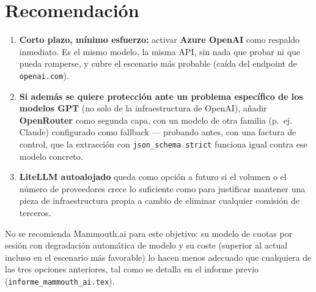 \documentclass[11pt,a4paper]{article}
\begin{document}
\section{Recomendación}

\begin{enumerate}
    \item \textbf{Corto plazo, mínimo esfuerzo:} activar \textbf{Azure OpenAI}
    como respaldo inmediato. Es el mismo modelo, la misma API, sin nada que
    probar ni que pueda romperse, y cubre el escenario más probable (caída del
    endpoint de \texttt{openai.com}).
    \item \textbf{Si además se quiere protección ante un problema específico de
    los modelos GPT} (no solo de la infraestructura de OpenAI), añadir
    \textbf{OpenRouter} como segunda capa, con un modelo de otra familia (p.~ej.
    Claude) configurado como fallback --- probando antes, con una factura de
    control, que la extracción con \texttt{json\_schema strict} funciona igual
    contra ese modelo concreto.
    \item \textbf{LiteLLM autoalojado} queda como opción a futuro si el volumen
    o el número de proveedores crece lo suficiente como para justificar
    mantener una pieza de infraestructura propia a cambio de eliminar cualquier
    comisión de terceros.
\end{enumerate}

No se recomienda Mammouth.ai para este objetivo: su modelo de cuotas por sesión
con degradación automática de modelo y su coste (superior al actual incluso en
el escenario más favorable) lo hacen menos adecuado que cualquiera de las tres
opciones anteriores, tal como se detalla en el informe previo
(\texttt{informe\_mammouth\_ai.tex}).
\end{document}
